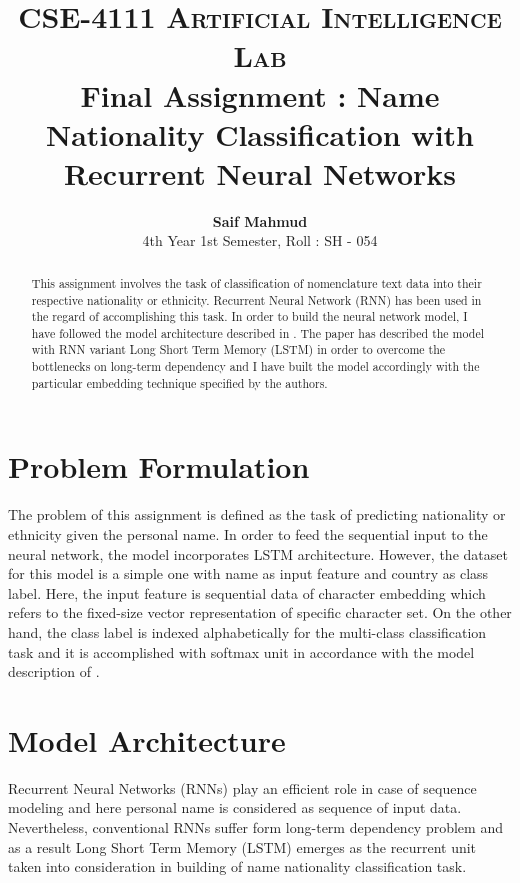 \documentclass[a4paper]{article}
\title{
		\usefont{OT1}{bch}{b}{n}
		\normalfont \normalsize \textsc{CSE-4111 Artificial Intelligence Lab} \\ [10pt]
		\huge Final Assignment : Name Nationality Classification with Recurrent Neural Networks \\
}
\author[0]{\textbf{Saif Mahmud}\\
		4th Year 1st Semester, Roll : SH - 054\\}
\begin{document}
\maketitle

\begin{abstract}
This assignment involves the task of classification of nomenclature text data into their respective nationality or ethnicity. Recurrent Neural Network (RNN) has been used in the regard of accomplishing this task. In order to build the neural network model, I have followed the model architecture described in \cite{lee2017name}. The paper has described the model with RNN variant Long Short Term Memory (LSTM) in order to overcome the bottlenecks on long-term dependency and I have built the model accordingly with the particular embedding technique specified by the authors.  
\end{abstract}

\section*{Problem Formulation}
The problem of this assignment is defined as the task of predicting nationality or ethnicity given the personal name. In order to feed the sequential input to the neural network, the model incorporates LSTM architecture. However, the dataset for this model is a simple one with name as input feature and country as class label. Here, the input feature is sequential data of character embedding which refers to the fixed-size vector representation of specific character set. On the other hand, the class label is indexed alphabetically for the multi-class classification task and it is accomplished with softmax unit in accordance with the model description of \cite{lee2017name}. 


\section*{Model Architecture}
Recurrent Neural Networks (RNNs) play an efficient role in case of sequence modeling and here personal name is considered as sequence of input data. Nevertheless, conventional RNNs suffer form long-term dependency problem and as a result Long Short Term Memory (LSTM) emerges as the recurrent unit taken into consideration in building of name nationality classification task.
\\
\end{document}
